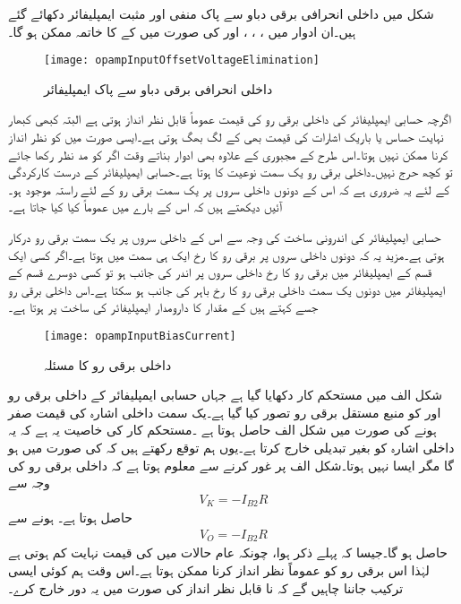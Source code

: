 شکل  میں داخلی انحرافی برقی دباو سے پاک منفی اور مثبت ایمپلیفائر دکھائے گئے ہیں۔ان ادوار میں ، ، ،  اور   کی صورت میں  کے  کا خاتمہ ممکن ہو گا۔ 
\begin{figure}
\centering
\texttt{[image: opampInputOffsetVoltageElimination]}
\caption{داخلی انحرافی برقی دباو سے پاک ایمپلیفائر}
\label{شکل_داخلی_انحرافی_برقی_دباو_سے_پاک_ایمپلیفائر}
\end{figure}
 

اگرچہ حسابی ایمپلیفائر کی داخلی برقی رو   کی قیمت عموماً قابل نظر انداز ہوتی ہے البتہ کبھی کبھار نہایت حساس یا باریک اشارات کی قیمت بھی کے لگ بھگ ہوتی ہے۔ایسی صورت میں کو نظر انداز کرنا ممکن نہیں ہوتا۔اس طرح کے مجبوری کے علاوہ بھی ادوار بناتے وقت اگر  کو مد نظر رکھا جائے تو کچھ حرج نہیں۔داخلی برقی رو یک سمت نوعیت کا ہوتا ہے۔حسابی ایمپلیفائر کے درست کارکردگی کے لئے یہ ضروری ہے کہ اس کے دونوں داخلی سروں  پر یک سمت برقی رو کے لئے راستہ موجود ہو۔آئیں دیکھتے ہیں کہ اس  کے بارے میں عموماً کیا کیا جاتا ہے۔

حسابی ایمپلیفائر کی اندرونی ساخت کی وجہ سے اس کے داخلی سروں پر یک سمت برقی رو درکار ہوتی ہے۔مزید یہ کہ دونوں داخلی سروں پر برقی رو کا رخ ایک ہی سمت میں ہوتا ہے۔اگر کسی ایک قسم کے ایمپلیفائر میں برقی رو کا رخ داخلی سروں پر اندر کی جانب ہو تو کسی دوسرے قسم کے ایمپلیفائر میں دونوں یک سمت داخلی برقی رو کا رخ باہر  کی جانب ہو سکتا ہے۔اس داخلی برقی رو جسے  کہتے ہیں کے مقدار کا دارومدار ایمپلیفائر کی ساخت پر ہوتا ہے۔
\begin{figure}
\centering
\texttt{[image: opampInputBiasCurrent]}
\caption{داخلی برقی رو کا مسئلہ}
\label{شکل_داخلی_برقی_رو_کا_مسئلہ}
\end{figure}
شکل  الف میں مستحکم کار دکھایا گیا ہے جہاں حسابی ایمپلیفائر کے داخلی برقی رو  اور کو منبع مستقل برقی رو  تصور کیا گیا ہے۔یک سمت داخلی اشارہ  کی قیمت صفر ہونے کی صورت میں  شکل  الف     حاصل ہوتا  ہے ۔مستحکم کار کی خاصیت یہ ہے کہ یہ داخلی اشارہ کو بغیر تبدیلی خارج کرتا ہے۔یوں ہم توقع رکھتے ہیں کہ  کی صورت میں  ہو گا مگر ایسا نہیں ہوتا۔شکل  الف     پر غور کرنے سے معلوم ہوتا ہے کہ داخلی برقی رو کی وجہ سے
\begin{align*}
V_K=-I_{B2} R
\end{align*}
حاصل ہوتا ہے۔  ہونے سے
\begin{align} \label{مساوات_انحرافی_رو_سے_پیدا_دباو}
V_O=-I_{B2}R
\end{align}
حاصل ہو گا۔جیسا کہ پہلے ذکر ہوا، چونکہ عام حالات میں  کی قیمت نہایت کم ہوتی ہے لہٰذا اس برقی رو کو عموماً نظر انداز کرنا ممکن ہوتا ہے۔اس وقت ہم کوئی ایسی ترکیب جاننا چاہیں گے کہ نا قابل نظر انداز  کی صورت میں یہ دور خارج کرے۔

